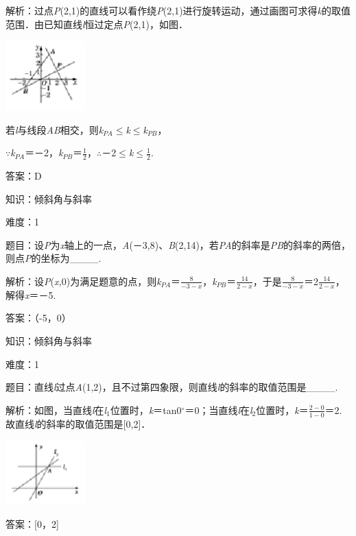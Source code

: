 \documentclass{article} %
\begin{document}
解析：过点\textit{P}(2,1)的直线可以看作绕\textit{P}(2,1)进行旋转运动，通过画图可求得\textit{k}的取值范围．由已知直线\textit{l}恒过定点\textit{P}(2,1)，如图．

\includegraphics*[width=1.21in, height=1.06in, keepaspectratio=false]{image267}

若\textit{l}与线段\textit{AB}相交，则\textit{k${}_{PA}$}$\mathrm{\le}$\textit{k}$\mathrm{\le}$\textit{k${}_{PB}$}，

$\mathrm{\because}$\textit{k${}_{PA}$}＝－2，\textit{k${}_{PB}$}＝$\frac{1}{2}$，$\mathrm{\therefore}$－2$\mathrm{\le}$\textit{k}$\mathrm{\le}\frac{1}{2}$.

答案：D

知识：倾斜角与斜率

难度：1

题目：设\textit{P}为\textit{x}轴上的一点，\textit{A}(－3,8)、\textit{B}(2,14)，若\textit{PA}的斜率是\textit{PB}的斜率的两倍，则点\textit{P}的坐标为\_\_\_\_.

解析：设\textit{P}(\textit{x,}0)为满足题意的点，则\textit{k${}_{PA}$}＝$\frac{8}{-3-x}$，\textit{k${}_{PB}$}＝$\frac{14}{2-x}$，于是$\frac{8}{-3-x}$＝2$\frac{14}{2-x}$，解得\textit{x}＝－5.

答案：（-5，0）

知识：倾斜角与斜率

难度：1

题目：直线\textit{l}过点\textit{A}(1,2)，且不过第四象限，则直线\textit{l}的斜率的取值范围是\_\_\_\_.

解析：如图，当直线\textit{l}在\textit{l}${}_{1}$位置时，\textit{k}＝tan0$\mathrm{{}^\circ}$＝0；当直线\textit{l}在\textit{l}${}_{2}$位置时，\textit{k}＝$\frac{2-0}{1-0}$＝2.故直线\textit{l}的斜率的取值范围是[0,2]．

\includegraphics*[width=1.21in, height=0.98in, keepaspectratio=false]{image269}

答案：[0，2]
\end{document}
